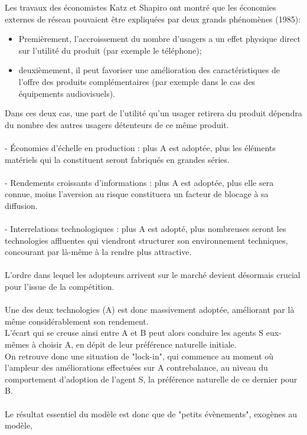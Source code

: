\documentclass[a4paper, 10pt]{article}
\begin{document}
Les travaux des économistes Katz et Shapiro ont montré que les économies externes de réseau pouvaient être expliquées
par deux grands phénomènes (1985):\\
\begin{itemize}
 \item Premièrement, l'accroissement du nombre d'usagers a un effet physique direct sur l'utilité du produit (par exemple le téléphone);
 \item deuxièmement, il peut favoriser une amélioration des caractéristiques de l'offre des produits complémentaires
(par exemple dans le cas des équipements audiovisuels).
\end{itemize}
Dans ces deux cas, une part de l'utilité qu'un usager retirera du produit dépendra du
nombre des autres usagers détenteurs de ce même produit.\\ \\
- Économies d'échelle en production : plus A est adoptée, plus les éléments matériels qui la constituent seront fabriqués en grandes séries.\\ \\
- Rendements croissants d'informations : plus A est adoptée, plus elle sera connue,
moins l'aversion au risque constituera un facteur de blocage à sa diffusion.\\ \\
- Interrelations technologiques : plus A est adopté,
plus nombreuses seront les technologies affluentes qui viendront structurer son environnement techniques,
concourant par là-même à la rendre plus attractive.\\ \\
L'ordre dans lequel les adopteurs arrivent sur le marché devient désormais crucial pour l'issue de la compétition.\\ \\
Une des deux technologies (A) est donc massivement adoptée, améliorant par là même considérablement son rendement.\\
L'écart qui se creuse ainsi entre A et B peut alors conduire les agents S eux-mêmes à choisir A,
en dépit de leur préférence naturelle initiale.\\
On retrouve donc une situation de "lock-in", qui commence au moment où l'ampleur des améliorations effectuées sur A contrebalance,
au niveau du comportement d'adoption de l'agent S, la préférence naturelle de ce dernier pour B.\\ \\
Le résultat essentiel du modèle est donc que de "petits évènements", exogènes au modèle,
\end{document}
